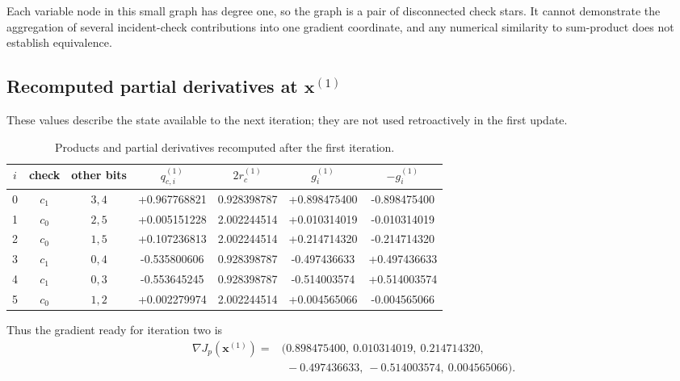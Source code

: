 \documentclass[11pt]{article}
\begin{document}
Each variable node in this small graph has degree one, so the graph is a pair
of disconnected check stars.  It cannot demonstrate the aggregation of
several incident-check contributions into one gradient coordinate, and any
numerical similarity to sum-product does not establish equivalence.

\subsection*{Recomputed partial derivatives at \(\boldsymbol{x}^{(1)}\)}

These values describe the state available to the next iteration; they are not
used retroactively in the first update.

\begin{table}[H]
\centering
\scriptsize
\caption{Products and partial derivatives recomputed after the first iteration.}
\label{tab:post-gradient}
\setlength{\tabcolsep}{4.6pt}
\begin{tabular}{c c c
  S[table-format=+1.9]
  S[table-format=1.9]
  S[table-format=+1.9]
  S[table-format=+1.9]}
\toprule
{$i$} & {check} & {other bits} & {$q_{c,i}^{(1)}$} & {$2r_c^{(1)}$}
& {$g_i^{(1)}$} & {$-g_i^{(1)}$} \\
 & $c_1$ & $3,4$ & +0.967768821 & 0.928398787 & +0.898475400 & -0.898475400 \\
1 & $c_0$ & $2,5$ & +0.005151228 & 2.002244514 & +0.010314019 & -0.010314019 \\
2 & $c_0$ & $1,5$ & +0.107236813 & 2.002244514 & +0.214714320 & -0.214714320 \\
3 & $c_1$ & $0,4$ & -0.535800606 & 0.928398787 & -0.497436633 & +0.497436633 \\
4 & $c_1$ & $0,3$ & -0.553645245 & 0.928398787 & -0.514003574 & +0.514003574 \\
5 & $c_0$ & $1,2$ & +0.002279974 & 2.002244514 & +0.004565066 & -0.004565066 \\
\bottomrule
\end{tabular}
\end{table}

Thus the gradient ready for iteration two is
\begin{align}
\nabla J_p(\boldsymbol{x}^{(1)})={}&
(0.898475400,\ 0.010314019,\ 0.214714320,\nonumber\\
&\phantom{(}-0.497436633,\ -0.514003574,\ 0.004565066).
\end{align}
\end{document}
